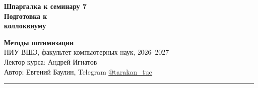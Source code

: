 \documentclass[10pt,a4paper]{article}
\begin{document}
\thispagestyle{fancy}

\noindent
\begin{minipage}[b]{0.6\textwidth}
  \RaggedRight{}
  {\color{hseaccent}\bfseries\small Шпаргалка к семинару 7}\\[1pt]
  {\color{hseblue}\bfseries\Large Подготовка к\\ коллоквиуму}
\end{minipage}\hfill
\begin{minipage}[b]{0.39\textwidth}
  \raggedleft\footnotesize
  {\bfseries Методы оптимизации}\\
  НИУ ВШЭ, факультет компьютерных наук, 2026--2027\\
  Лектор курса: Андрей Игнатов\\
  Автор: Евгений Баулин, Telegram \href{https://t.me/tarakan_tuc}{@tarakan\_tuc}
\end{minipage}

\vspace{2pt}
{\color{hseblue}\rule{\textwidth}{0.8pt}}
\vspace{-4pt}
\end{document}
